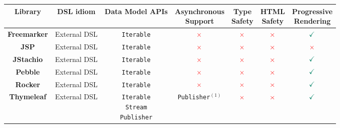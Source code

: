 \begin{table}[h]
  \small
  \tabcolsep=0.1cm
  \def\arraystretch{1.2}
  \begin{tabular}{|c|c|c|c|c|c|c|}
    \hline
    \textbf{Library}
     & \textbf{DSL idiom}
     & \textbf{Data Model APIs}
     & \shortstack{\textbf{Asynchronous}           \\\textbf{Support}}
     & \shortstack{\textbf{Type}                   \\\textbf{Safety}}
     & \shortstack{\textbf{HTML}                   \\\textbf{Safety}}
     & \shortstack{\textbf{Progressive}            \\\textbf{Rendering}}
    \\
    \hline
    \textbf{Freemarker}
     & External DSL
     & \texttt{Iterable}
     & \large{$\textcolor{red}{\times}$}
     & \large{$\textcolor{red}{\times}$}
     & \large{$\textcolor{red}{\times}$}
     & \large{$\textcolor{PineGreen}{\checkmark}$}
    \\
    \hline
    \textbf{JSP}
     & External DSL
     & \texttt{Iterable}
     & \large{$\textcolor{red}{\times}$}
     & \large{$\textcolor{red}{\times}$}
     & \large{$\textcolor{red}{\times}$}
     & \large{$\textcolor{red}{\times}$}
    \\
    \hline
    \textbf{JStachio}
     & External DSL
     & \texttt{Iterable}
     & \large{$\textcolor{red}{\times}$}
     & \large{$\textcolor{red}{\times}$}
     & \large{$\textcolor{red}{\times}$}
     & \large{$\textcolor{PineGreen}{\checkmark}$}
    \\\hline
    \textbf{Pebble}
     & External DSL
     & \texttt{Iterable}
     & \large{$\textcolor{red}{\times}$}
     & \large{$\textcolor{red}{\times}$}
     & \large{$\textcolor{red}{\times}$}
     & \large{$\textcolor{PineGreen}{\checkmark}$}
    \\
    \hline
    \textbf{Rocker}
     & External DSL
     & \texttt{Iterable}
     & \large{$\textcolor{red}{\times}$}
     & \large{$\textcolor{red}{\times}$}
     & \large{$\textcolor{red}{\times}$}
     & \large{$\textcolor{PineGreen}{\checkmark}$}
    \\
    \hline
    \textbf{Thymeleaf}
     & External DSL
     & \shortstack{\texttt{Iterable} \\\texttt{Stream} \\\texttt{Publisher}}
     & \texttt{Publisher}$^{(1)}$
     & \large{$\textcolor{red}{\times}$}
     & \large{$\textcolor{red}{\times}$}
     & \large{$\textcolor{PineGreen}{\checkmark}$}

\end{tabular}
\end{table}
